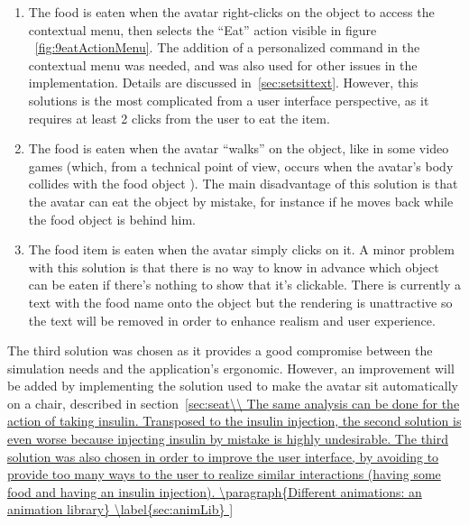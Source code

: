\begin{itemize}
\begin{itemize}
\begin{enumerate}
\item The food is eaten when the avatar right-clicks on the object to access the contextual menu, then selects the ``Eat'' action visible in figure ~\ref{fig:9eatActionMenu}. The addition of a personalized command in the contextual menu was needed, and was also used for other issues in the implementation. Details are discussed in~\ref{sec:setsittext}. However, this solutions is the most complicated from a user interface perspective, as it requires at least 2 clicks from the user to eat the item.
\item The food is eaten when the avatar ``walks'' on the object, like in some video games (which, from a technical point of view, occurs when the avatar's body collides with the food object ). The main disadvantage of this solution is that the avatar can eat the object by mistake, for instance if he moves back while the food object is behind him.
\item The food item is eaten when the avatar simply clicks on it. A minor problem with this solution is that there is no way to know in advance which object can be eaten if there's nothing to show that it's clickable. There is currently a text with the food name onto the object but the rendering is unattractive so the text will be removed in order to enhance realism and user experience.
\end{enumerate}

The third solution was chosen as it provides a good compromise between the simulation needs and the application's ergonomic. However, an improvement will be added by implementing the solution used to make the avatar sit automatically on a chair, described in section~\ref{sec:seat\\

The same analysis can be done for the action of taking insulin. Transposed to the insulin injection, the second solution is even worse 
because injecting insulin by mistake is highly undesirable. 
The third solution was also
chosen in order to improve the user interface, 
by avoiding to provide too many ways to the user to realize 
similar interactions (having some food and having an insulin injection). 

	\paragraph{Different animations: an animation library}
\label{sec:animLib}

}
\end{itemize}
\end{itemize}
